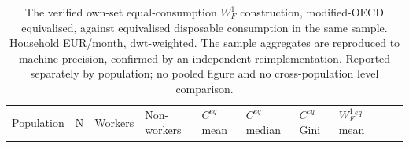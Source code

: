 \documentclass[11pt,a4paper]{article}
\begin{document}
\small\setlength{\tabcolsep}{3pt}\begin{longtable}[]{@{}
  >{\raggedright\arraybackslash}p{}
  >{\raggedright\arraybackslash}p{}
  >{\raggedright\arraybackslash}p{}
  >{\raggedright\arraybackslash}p{}
  >{\raggedright\arraybackslash}p{}
  >{\raggedright\arraybackslash}p{}
  >{\raggedright\arraybackslash}p{}
  >{\raggedright\arraybackslash}p{}
  >{\raggedright\arraybackslash}p{}
  >{\raggedright\arraybackslash}p{}@{}}
\caption{The verified own-set equal-consumption \(W^1_F\) construction, modified-OECD equivalised, against equivalised disposable consumption in the same sample. Household EUR/month, dwt-weighted. The sample aggregates are reproduced to machine precision, confirmed by an independent reimplementation. Reported separately by population; no pooled figure and no cross-population level comparison.}\tabularnewline
\toprule\noalign{}
\begin{minipage}[b]{\linewidth}\raggedright
Population
\end{minipage} & \begin{minipage}[b]{\linewidth}\raggedright
N
\end{minipage} & \begin{minipage}[b]{\linewidth}\raggedright
Workers
\end{minipage} & \begin{minipage}[b]{\linewidth}\raggedright
Non-workers
\end{minipage} & \begin{minipage}[b]{\linewidth}\raggedright
\(C^{eq}\) mean
\end{minipage} & \begin{minipage}[b]{\linewidth}\raggedright
\(C^{eq}\) median
\end{minipage} & \begin{minipage}[b]{\linewidth}\raggedright
\(C^{eq}\) Gini
\end{minipage} & \begin{minipage}[b]{\linewidth}\raggedright
\(W^1_F{}^{eq}\) mean
\end{minipage} & \begin{minipage}[b]{\linewidth}\raggedright

\end{minipage}
\end{longtable}
\end{document}
